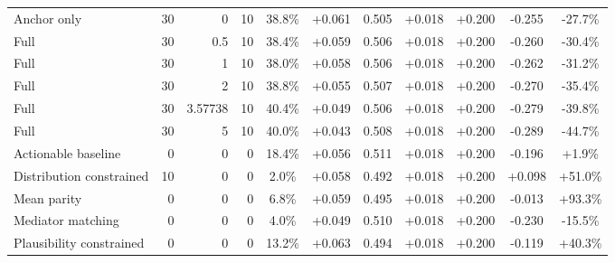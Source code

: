 \begin{table}[htbp]
\begin{tabular}{lrrrccccccc}
Anchor only & 30 & 0 & 10 & 38.8\% & +0.061 & 0.505 & +0.018 & +0.200 & -0.255 & -27.7\% \\
Full & 30 & 0.5 & 10 & 38.4\% & +0.059 & 0.506 & +0.018 & +0.200 & -0.260 & -30.4\% \\
Full & 30 & 1 & 10 & 38.0\% & +0.058 & 0.506 & +0.018 & +0.200 & -0.262 & -31.2\% \\
Full & 30 & 2 & 10 & 38.8\% & +0.055 & 0.507 & +0.018 & +0.200 & -0.270 & -35.4\% \\
Full & 30 & 3.57738 & 10 & 40.4\% & +0.049 & 0.506 & +0.018 & +0.200 & -0.279 & -39.8\% \\
Full & 30 & 5 & 10 & 40.0\% & +0.043 & 0.508 & +0.018 & +0.200 & -0.289 & -44.7\% \\
Actionable baseline & 0 & 0 & 0 & 18.4\% & +0.056 & 0.511 & +0.018 & +0.200 & -0.196 & +1.9\% \\
Distribution constrained & 10 & 0 & 0 & 2.0\% & +0.058 & 0.492 & +0.018 & +0.200 & +0.098 & +51.0\% \\
Mean parity & 0 & 0 & 0 & 6.8\% & +0.059 & 0.495 & +0.018 & +0.200 & -0.013 & +93.3\% \\
Mediator matching & 0 & 0 & 0 & 4.0\% & +0.049 & 0.510 & +0.018 & +0.200 & -0.230 & -15.5\% \\
Plausibility constrained & 0 & 0 & 0 & 13.2\% & +0.063 & 0.494 & +0.018 & +0.200 & -0.119 & +40.3\% \\
\bottomrule
\end{tabular}
\end{table}